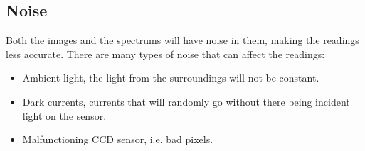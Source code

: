 
\subsection{Noise}
\label{sec:noise_and_dark_current}
Both the images and the spectrums will have noise in them, making the readings less accurate. There are many types of noise that can affect the readings: 
\begin{itemize}
    \item Ambient light, the light from the surroundings will not be constant.
    \item Dark currents, currents that will randomly go without there being incident light on the sensor.
    \item Malfunctioning CCD sensor, i.e. bad pixels. 
\end{itemize}




% 
